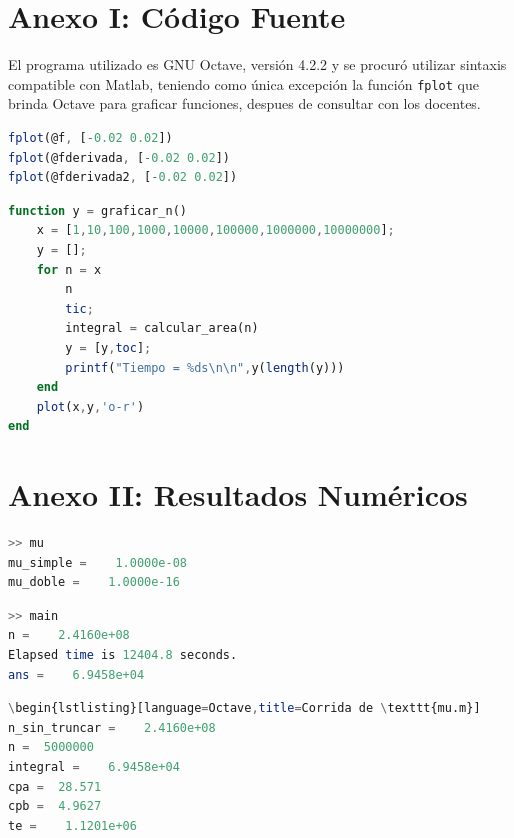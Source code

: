 \documentclass[11pt,a4paper]{article}
\begin{document}
\newpage
\appendix
\section{Anexo I: Código Fuente}

El programa utilizado es GNU Octave, versión 4.2.2 y se procuró utilizar sintaxis compatible con Matlab, teniendo como única excepción la función \texttt{fplot} que brinda Octave para graficar funciones, despues de consultar con los docentes.



\newpage


\newpage


\newpage
\begin{lstlisting}[language=Octave,title=Generación de graficos]
fplot(@f, [-0.02 0.02])
fplot(@fderivada, [-0.02 0.02])
fplot(@fderivada2, [-0.02 0.02])
\end{lstlisting}

\begin{lstlisting}[language=Octave,title=Truncamiento y gráfico de n]
function y = graficar_n()
    x = [1,10,100,1000,10000,100000,1000000,10000000];
    y = [];
    for n = x
        n
        tic;
        integral = calcular_area(n)
        y = [y,toc]; 
        printf("Tiempo = %ds\n\n",y(length(y)))   
    end
    plot(x,y,'o-r')
end
\end{lstlisting}

\newpage
\section{Anexo II: Resultados Numéricos}

\begin{lstlisting}[language=Octave,title=Corrida de \texttt{mu.m}]
>> mu
mu_simple =    1.0000e-08
mu_doble =    1.0000e-16
\end{lstlisting}

\begin{lstlisting}[language=Octave,title=title=Corrida de \texttt{main.m} con n original]
>> main
n =    2.4160e+08
Elapsed time is 12404.8 seconds.
ans =    6.9458e+04
\end{lstlisting}

\begin{lstlisting}[language=Octave,title=title=Corrida de \texttt{main.m}]
\begin{lstlisting}[language=Octave,title=Corrida de \texttt{mu.m}]
n_sin_truncar =    2.4160e+08
n =  5000000
integral =    6.9458e+04  
cpa =  28.571
cpb =  4.9627
te =    1.1201e+06
\end{lstlisting}
\end{document}
